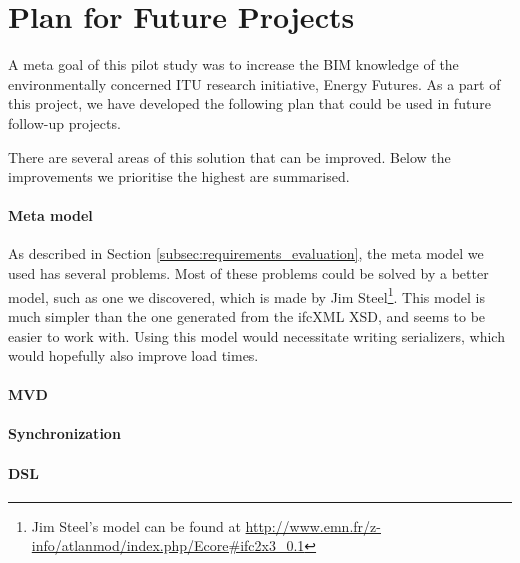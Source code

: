 \section{Plan for Future Projects}
\label{sec:plan_for_future_projects}
A meta goal of this pilot study was to increase the BIM knowledge of the environmentally concerned ITU research initiative, Energy Futures. As a part of this project, we have developed the following plan that could be used in future follow-up projects.

There are several areas of this solution that can be improved. Below the improvements we prioritise the highest are summarised. 
\paragraph{Meta model}
As described in Section \ref{subsec:requirements_evaluation}, the meta model we used has several problems. Most of these problems could be solved by a better model, such as one we discovered, which is made by Jim Steel\footnote{Jim Steel's model can be found at \url{http://www.emn.fr/z-info/atlanmod/index.php/Ecore#ifc2x3_0.1}}. This model is much simpler than the one generated from the ifcXML XSD, and seems to be easier to work with. Using this model would necessitate writing serializers, which would hopefully also improve load times.
\paragraph{MVD}
\paragraph{Synchronization}
\paragraph{DSL}

